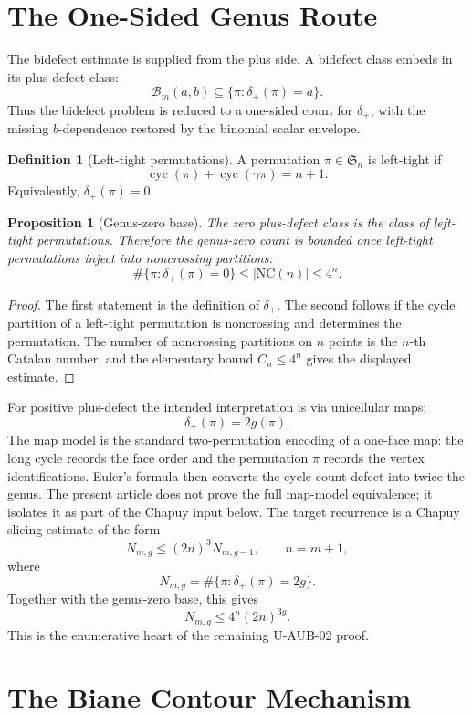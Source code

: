 \documentclass[11pt]{article}
\theoremstyle{plain}
\newtheorem{proposition}[theorem]{Proposition}
\theoremstyle{definition}
\newtheorem{definition}[theorem]{Definition}
\theoremstyle{remark}
\DeclareMathOperator{\cyc}{cyc}
\newcommand{\Sym}{\mathfrak S}
\newcommand{\g}{\gamma}
\newcommand{\p}{\pi}
\newcommand{\defp}{\delta_{+}}
\newcommand{\NC}{\mathrm{NC}}
\begin{document}
\section{The One-Sided Genus Route}

The bidefect estimate is supplied from the plus side.  A bidefect class embeds
in its plus-defect class:
\[
  \mathcal B_m(a,b)\subseteq \{\p:\defp(\p)=a\}.
\]
Thus the bidefect problem is reduced to a one-sided count for \(\defp\), with
the missing \(b\)-dependence restored by the binomial scalar envelope.

\begin{definition}[Left-tight permutations]
A permutation \(\p\in\Sym_n\) is left-tight if
\[
  \cyc(\p)+\cyc(\g\p)=n+1.
\]
Equivalently, \(\defp(\p)=0\).
\end{definition}

\begin{proposition}[Genus-zero base]
The zero plus-defect class is the class of left-tight permutations.  Therefore
the genus-zero count is bounded once left-tight permutations inject into
noncrossing partitions:
\[
  \#\{\p:\defp(\p)=0\}
  \leq |\NC(n)|
  \leq 4^n.
\]
\end{proposition}

\begin{proof}
The first statement is the definition of \(\defp\).  The second follows if the
cycle partition of a left-tight permutation is noncrossing and determines the
permutation.  The number of noncrossing partitions on \(n\) points is the
\(n\)-th Catalan number, and the elementary bound \(C_n\leq 4^n\) gives the
displayed estimate.
\end{proof}

For positive plus-defect the intended interpretation is via unicellular maps:
\[
  \defp(\p)=2g(\p).
\]
The map model is the standard two-permutation encoding of a one-face map: the
long cycle records the face order and the permutation \(\p\) records the
vertex identifications.  Euler's formula then converts the cycle-count defect
into twice the genus.  The present article does not prove the full map-model
equivalence; it isolates it as part of the Chapuy input below.
The target recurrence is a Chapuy slicing estimate of the form
\[
  N_{m,g}\leq (2n)^3 N_{m,g-1},
  \qquad n=m+1,
\]
where
\[
  N_{m,g}=\#\{\p:\defp(\p)=2g\}.
\]
Together with the genus-zero base, this gives
\[
  N_{m,g}\leq 4^n(2n)^{3g}.
\]
This is the enumerative heart of the remaining U-AUB-02 proof.

\section{The Biane Contour Mechanism}
\end{document}
